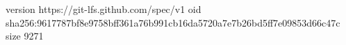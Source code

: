 version https://git-lfs.github.com/spec/v1
oid sha256:9617787bf8e9758bff361a76b991cb16da5720a7e7b26bd5ff7e09853d66c47c
size 9271
